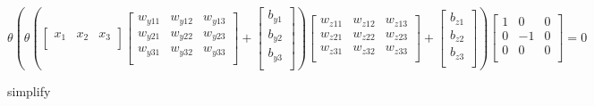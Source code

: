 \documentclass{article}
\begin{document}
\[
\theta(
    \theta(
\begin{bmatrix}   
    x_1 & x_2  & x_3\\
    \end{bmatrix}
\begin{bmatrix}
    w_{y11} & w_{y12} & w_{y13}\\
    w_{y21} & w_{y22} & w_{y23}\\
    w_{y31} & w_{y32} & w_{y33}\\
\end{bmatrix}
    +
    \begin{bmatrix}
        b_{y1}\\
        b_{y2}\\
        b_{y3}\\
    \end{bmatrix}
    )
\begin{bmatrix}
    w_{z11} & w_{z12} & w_{z13}\\
    w_{z21} & w_{z22} & w_{z23}\\
    w_{z31} & w_{z32} & w_{z33}\\
\end{bmatrix}
    +
    \begin{bmatrix}
        b_{z1}\\
        b_{z2}\\
        b_{z3}\\
    \end{bmatrix}
)
%
\begin{bmatrix}   
    1 & 0 & 0 \\
    0 & -1 & 0 \\
    0 & 0 & 0 \\
    \end{bmatrix} 
%
    = 0
\]

\hbox{simplify}
\end{document}
